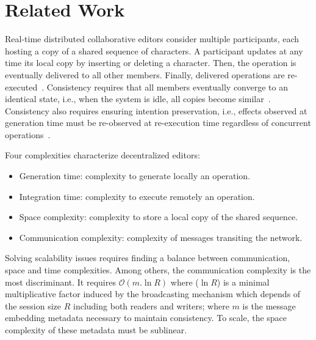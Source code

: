 \section{Related Work}
\label{sec:relatedwork}

Real-time distributed collaborative editors consider multiple
participants, each hosting a copy of a shared sequence of
characters. A participant updates at any time its local copy by
inserting or deleting a character. Then, the operation is eventually
delivered to all other members. Finally, delivered operations are
re-executed~\cite{saito2005optimistic}. Consistency requires that all
members eventually converge to an identical state, i.e., when the
system is idle, all copies become
similar~\cite{bailis2013eventual}. Consistency also requires ensuring
intention preservation, i.e., effects observed at generation time must
be re-observed at re-execution time regardless of concurrent
operations~\cite{sun1998achieving}. 

Four complexities characterize decentralized editors:
\begin{itemize}
\item Generation time: complexity to generate locally an operation.
\item Integration time: complexity to execute remotely an operation.
\item Space complexity: complexity to store a local copy of the shared sequence.
\item Communication complexity: complexity of messages transiting the network.
\end{itemize}
Solving scalability issues requires finding a balance between communication,
space and time complexities.  Among others, the communication complexity is the
most discriminant. It requires $\mathcal{O}(m.\ln{R})$ where ($\ln{R}$) is a
minimal multiplicative factor induced by the broadcasting mechanism which
depends of the session size $R$ including both readers and writers; where $m$ is
the message embedding metadata necessary to maintain consistency. To scale, the
space complexity of these metadata must be sublinear.

